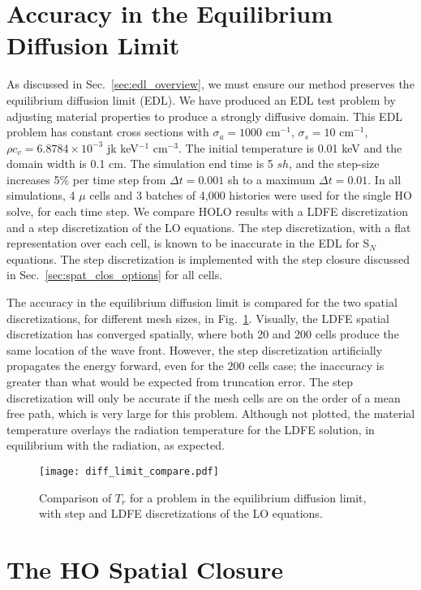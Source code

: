 \section{Accuracy in the Equilibrium Diffusion Limit}
\label{sec:edl_results}

As discussed in Sec.~\ref{sec:edl_overview}, we must ensure our method preserves the
equilibrium diffusion limit (EDL).
We have produced an EDL test problem by adjusting material properties to produce a strongly
diffusive domain. This EDL problem has constant cross sections with $\sigma_a=1000$
cm$^{-1}$, $\sigma_s=10$ cm$^{-1}$, $\rho c_v=6.8784\times 10^{-3}$ jk keV$^{-1}$
cm$^{-3}$.  The initial temperature is 0.01 keV and the domain width is 0.1 cm. The simulation
end time is 5 $sh$, and the step-size increases 5\% per time step from $\Delta t = 0.001$
sh to a maximum $\Delta t = 0.01$.
In all simulations, 4 $\mu$ cells and 3 batches of 4,000 histories were used for the
single HO solve, for each time step.
We compare HOLO results with a LDFE discretization and a step discretization of the LO
equations.  The step discretization, with a flat representation over each cell, is known
to be inaccurate in the EDL for S$_N$ equations.  The step discretization
is implemented with the step closure discussed in Sec.~\ref{sec:spat_clos_options} for all
cells.

The accuracy in the equilibrium diffusion limit is compared for the two spatial
discretizations, for different mesh sizes, in Fig.~\ref{fig:diff_limit}.  Visually, 
the LDFE spatial discretization has converged spatially, where both 20 and 200 cells
produce the same location of the wave front.  However, the step
discretization artificially propagates the energy forward, even for the 200 cells case; the inaccuracy is greater than
what would be expected from truncation error.  The step discretization will
only be accurate if the mesh cells are on the order of a mean free path, which is very large for this
problem.  Although not plotted, the material temperature overlays the radiation
temperature for the LDFE solution, in equilibrium with the radiation, as expected.
\begin{figure}[H]
    \centering
    \texttt{[image: diff\_limit\_compare.pdf]}
    \caption{\label{fig:diff_limit}Comparison of $T_r$ for a problem in the equilibrium
    diffusion limit, with step and LDFE discretizations of the LO
equations.}
\end{figure}

\section{The HO Spatial Closure}

